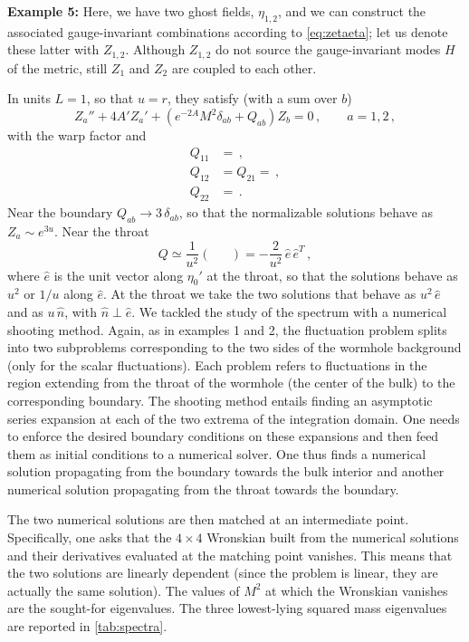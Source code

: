 \noindent 
\textbf{Example 5:} Here, we have two ghost fields, $\eta_{1,2}$, and we can construct the associated gauge-invariant combinations according to \cref{eq:zetaeta}; let us denote these latter with $Z_{1,2}$. %
Although $Z_{1,2}$ do not source the gauge-invariant modes $H$ of the metric, still $Z_1$ and $Z_2$ are coupled to each other. 

In units $L=1$, so that $u=r$, they satisfy (with a sum over $b$)
\begin{equation}
	Z_a''+4A'Z_a'+\left(e^{-2A}M^2\delta_{ab}+Q_{ab}\right)Z_b=0\,,\qquad a=1,2\,,
\end{equation}
with the warp factor  and
\begin{align}
	Q_{11} &= \,, \\
	Q_{12} &= Q_{21} = \,, \\
	Q_{22} &= \,.
\end{align}
Near the boundary $Q_{ab}\to 3\,\delta_{ab}$, so that the normalizable solutions behave as $Z_a\sim e^{3u}$.
Near the throat
\begin{equation}
	Q\simeq\frac{1}{u^2}\begin{pmatrix} & \\  & \end{pmatrix}=-\frac{2}{u^2}\,\hat e\,\hat e^T\,,
\end{equation}
where $\hat e$ is the unit vector along $\eta_0'$ at the throat, so that the solutions behave as $u^2$ or $1/u$ along $\hat e$.
At the throat we take the two solutions that behave as $u^2\,\hat e$ and as $u\,\hat n$, with $\hat n\perp\hat e$.
We tackled the study of the spectrum with a numerical shooting method.
Again, as in examples 1 and 2, the fluctuation problem splits into two subproblems corresponding to the two sides of the wormhole background (only for the scalar fluctuations).
Each problem refers to fluctuations in the region extending from the throat of the wormhole (the center of the bulk) to the corresponding boundary.
The shooting method entails finding an asymptotic series expansion at each of the two extrema of the integration domain.
One needs to enforce the desired boundary conditions on these expansions and then feed them as initial conditions to a numerical solver.
One thus finds a numerical solution propagating from the boundary towards the bulk interior and another numerical solution propagating from the throat towards the boundary.

The two numerical solutions are then matched at an intermediate point.
Specifically, one asks that the $4\times 4$ Wronskian built from the numerical solutions and their derivatives evaluated at the matching point vanishes.
This means that the two solutions are linearly dependent (since the problem is linear, they are actually the same solution).
The values of $M^2$ at which the Wronskian vanishes are the sought-for eigenvalues.
The three lowest-lying squared mass eigenvalues are reported in \cref{tab:spectra}.

